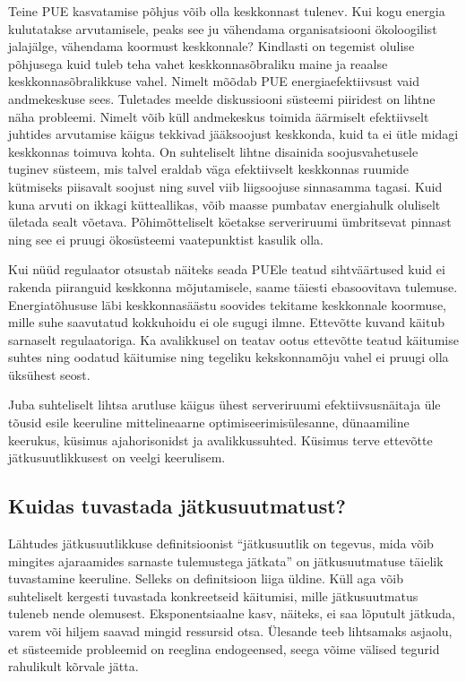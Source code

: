 \documentclass{tufte-book}
\begin{document}
Teine PUE kasvatamise põhjus võib olla keskkonnast tulenev. Kui kogu energia kulutatakse arvutamisele, peaks see ju vähendama organisatsiooni ökoloogilist jalajälge, vähendama koormust keskkonnale? Kindlasti on tegemist olulise põhjusega kuid tuleb teha vahet keskkonnasõbraliku maine ja reaalse keskkonnasõbralikkuse vahel. Nimelt mõõdab PUE energiaefektiivsust vaid andmekeskuse sees. Tuletades meelde diskussiooni süsteemi piiridest on lihtne näha probleemi. Nimelt võib küll andmekeskus toimida äärmiselt efektiivselt juhtides arvutamise käigus tekkivad jääksoojust keskkonda, kuid ta ei ütle midagi keskkonnas toimuva kohta. On suhteliselt lihtne disainida soojusvahetusele tuginev süsteem, mis talvel eraldab väga efektiivselt keskkonnas ruumide kütmiseks piisavalt soojust ning suvel viib liigsoojuse sinnasamma tagasi. Kuid kuna arvuti on ikkagi kütteallikas, võib maasse pumbatav energiahulk oluliselt ületada sealt võetava. Põhimõtteliselt köetakse serveriruumi ümbritsevat pinnast ning see ei pruugi ökosüsteemi vaatepunktist kasulik olla. 

Kui nüüd regulaator otsustab näiteks seada PUEle teatud sihtväärtused kuid ei rakenda piiranguid keskkonna mõjutamisele, saame täiesti ebasoovitava tulemuse. Energiatõhususe läbi keskkonnasäästu soovides tekitame keskkonnale koormuse, mille suhe saavutatud kokkuhoidu ei ole sugugi ilmne. Ettevõtte kuvand käitub sarnaselt regulaatoriga. Ka avalikkusel on teatav ootus ettevõtte teatud käitumise suhtes ning oodatud käitumise ning tegeliku kekskonnamõju vahel ei pruugi olla üksühest seost.

Juba suhteliselt lihtsa arutluse käigus ühest serveriruumi efektiivsusnäitaja üle tõusid esile keeruline mittelineaarne optimiseerimisülesanne, dünaamiline keerukus, küsimus ajahorisonidst ja avalikkussuhted. Küsimus terve ettevõtte jätkusuutlikkusest on veelgi keerulisem. 


\subsection{Kuidas tuvastada jätkusuutmatust?}
Lähtudes jätkusuutlikkuse definitsioonist \enquote{jätkusuutlik on tegevus, mida võib mingites ajaraamides sarnaste tulemustega jätkata} on jätkusuutmatuse täielik tuvastamine keeruline. Selleks on definitsioon liiga üldine. Küll aga võib suhteliselt kergesti tuvastada konkreetseid käitumisi, mille jätkusuutmatus tuleneb nende olemusest. Eksponentsiaalne kasv, näiteks, ei saa lõputult jätkuda, varem või hiljem saavad mingid ressursid otsa. Ülesande teeb lihtsamaks asjaolu, et süsteemide probleemid on reeglina endogeensed, seega võime välised tegurid rahulikult kõrvale jätta.
\end{document}
